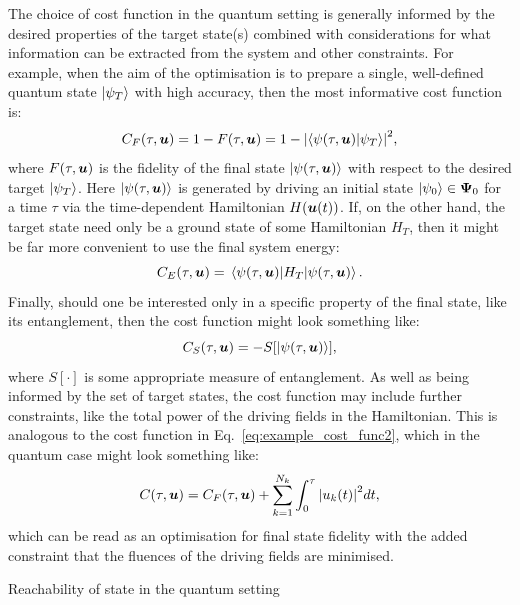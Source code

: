 The choice of cost function in the quantum setting is generally informed by the desired properties of the target state(s) combined with considerations for what information can be extracted from the system and other constraints. For example, when the aim of the optimisation is to prepare a single, well-defined quantum state $\ket{\psi_T}$ with high accuracy, then the most informative cost function is:
\begin{equation}\label{eq:costfunc_fidelity}
    C_F(\tau, \boldsymbol{u}) = 1 - F(\tau, \boldsymbol{u}) = 1 - \abs{\braket{\psi(\tau, \boldsymbol{u})}{\psi_T}}^2,
\end{equation}
where $F(\tau, \boldsymbol{u})$ is the fidelity of the final state $\ket{\psi(\tau, \boldsymbol{u})}$ with respect to the desired target $\ket{\psi_T}$. Here $\ket{\psi(\tau, \boldsymbol{u})}$ is generated by driving an initial state $\ket{\psi_0} \in \boldsymbol \Psi_0$ for a time $\tau$ via the time-dependent Hamiltonian $H(\boldsymbol{u}(t))$. If, on the other hand, the target state need only be a ground state of some Hamiltonian $H_T$, then it might be far more convenient to use the final system energy:
\begin{equation}\label{eq:costfunc_energy}
    C_E(\tau, \boldsymbol{u}) = \mel{\psi(\tau, \boldsymbol{u})}{H_T}{\psi(\tau, \boldsymbol{u})}.
\end{equation}
Finally, should one be interested only in a specific property of the final state, like its entanglement, then the cost function might look something like:
\begin{equation}\label{eq:costfunc_entanglement}
    C_S(\tau, \boldsymbol{u}) = -S[\ket{\psi(\tau, \boldsymbol{u})}],
\end{equation}
where $S[\cdot]$ is some appropriate measure of entanglement.  As well as being informed by the set of target states, the cost function may include further constraints, like the total power of the driving fields in the Hamiltonian. This is analogous to the cost function in Eq.~\eqref{eq:example_cost_func2}, which in the quantum case might look something like:
\begin{equation}\label{eq:costfunc_constraint}
    C(\tau, \boldsymbol{u}) = C_F(\tau, \boldsymbol{u}) + \sum_{k = 1}^{N_k} \int_0^{\tau} \abs{u_k(t)}^2 dt,
\end{equation}
which can be read as an optimisation for final state fidelity with the added constraint that the fluences of the driving fields are minimised. 

\begin{mycolorbox}{Reachability of state in the quantum setting}
    
\end{mycolorbox}

